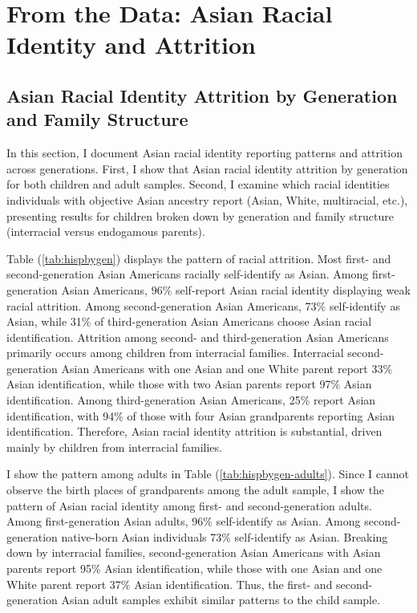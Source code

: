 \section{From the Data: Asian Racial Identity and Attrition}\label{sec:attrition}

\subsection{Asian Racial Identity Attrition by Generation and Family Structure}

In this section, I document Asian racial identity reporting patterns and attrition across generations. First, I show that Asian racial identity attrition by generation for both children and adult samples. Second, I examine which racial identities individuals with objective Asian ancestry report (Asian, White, multiracial, etc.), presenting results for children broken down by generation and family structure (interracial versus endogamous parents).

Table (\ref{tab:hispbygen}) displays the pattern of racial attrition. Most first- and second-generation Asian Americans racially self-identify as Asian. Among first-generation Asian Americans, 96\% self-report Asian racial identity displaying weak racial attrition. Among second-generation Asian Americans, 73\% self-identify as Asian, while 31\% of third-generation Asian Americans choose Asian racial identification. Attrition among second- and third-generation Asian Americans primarily occurs among children from interracial families. Interracial second-generation Asian Americans with one Asian and one White parent report 33\% Asian identification, while those with two Asian parents report 97\% Asian identification. Among third-generation Asian Americans, 25\% report Asian identification, with 94\% of those with four Asian grandparents reporting Asian identification. Therefore, Asian racial identity attrition is substantial, driven mainly by children from interracial families.

I show the pattern among adults in Table (\ref{tab:hispbygen-adults}). Since I cannot observe the birth places of grandparents among the adult sample, I show the pattern of Asian racial identity among first- and second-generation adults. Among first-generation Asian adults, 96\% self-identify as Asian. Among second-generation native-born Asian individuals 73\%  self-identify as Asian. Breaking down by interracial families, second-generation Asian Americans with Asian parents report 95\% Asian identification, while those with one Asian and one White parent report 37\% Asian identification. Thus, the first- and second-generation Asian adult samples exhibit similar patterns to the child sample.

